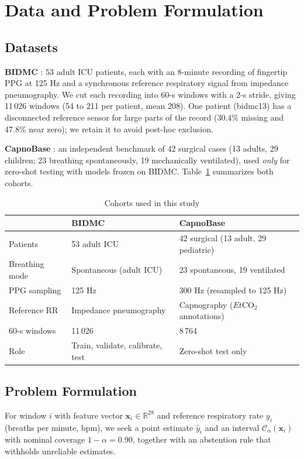 \documentclass[conference]{IEEEtran}
\newcommand{\Cset}{\mathcal{C}_{\alpha}}
\begin{document}
\section{Data and Problem Formulation}\label{sec:data}
\subsection{Datasets}
\textbf{BIDMC} \cite{pimentel2016,goldberger2000}: 53 adult ICU patients, each with an 8-minute recording of fingertip PPG at 125 Hz and a synchronous reference respiratory signal from impedance pneumography. We cut each recording into 60-s windows with a 2-s stride, giving 11\,026 windows (54 to 211 per patient, mean 208). One patient (bidmc13) has a disconnected reference sensor for large parts of the record (30.4\% missing and 47.8\% near zero); we retain it to avoid post-hoc exclusion.

\textbf{CapnoBase} \cite{karlen2013}: an independent benchmark of 42 surgical cases (13 adults, 29 children; 23 breathing spontaneously, 19 mechanically ventilated), used \emph{only} for zero-shot testing with models frozen on BIDMC. Table~\ref{tab:cohorts} summarizes both cohorts.

\begin{table}[!t]
\caption{Cohorts used in this study}
\label{tab:cohorts}
\centering\footnotesize
\renewcommand{\arraystretch}{1.1}
\begin{tabular}{@{}p{1.9cm}p{2.7cm}p{3.3cm}@{}}
\toprule
 & \textbf{BIDMC} & \textbf{CapnoBase} \\
\midrule
Patients & 53 adult ICU & 42 surgical (13 adult, 29 pediatric) \\
Breathing mode & Spontaneous (adult ICU) & 23 spontaneous, 19 ventilated \\
PPG sampling & 125 Hz & 300 Hz (resampled to 125 Hz) \\
Reference RR & Impedance pneumography & Capnography ($Et\text{CO}_2$ annotations) \\
60-s windows & 11\,026 & 8\,764 \\
Role & Train, validate, calibrate, test & Zero-shot test only \\
\bottomrule
\end{tabular}
\end{table}

\subsection{Problem Formulation}
For window $i$ with feature vector $\mathbf{x}_i\in\mathbb{R}^{28}$ and reference respiratory rate $y_i$ (breaths per minute, bpm), we seek a point estimate $\hat{y}_i$ and an interval $\Cset(\mathbf{x}_i)$ with nominal coverage $1-\alpha=0.90$, together with an abstention rule that withholds unreliable estimates.
\end{document}
